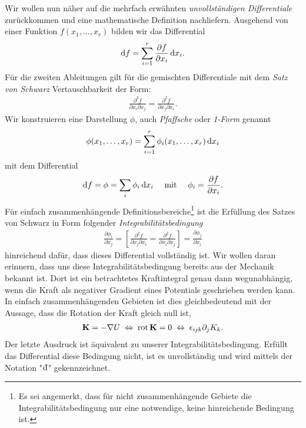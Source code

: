 Wir wollen nun näher auf die mehrfach erwähnten \emph{unvollständigen Differentiale} zurückkommen und eine mathematische Definition nachliefern. Ausgehend von einer Funktion $f(x_1,\ldots,x_r)$ bilden wir das Differential
\begin{align*}
    \mathop{}\!\mathrm{d} f = \sum_{i=1}^r \frac{\partial f}{\partial x_i} \mathop{}\!\mathrm{d} x_i.
\end{align*}
Für die zweiten Ableitungen gilt für die gemischten Differentiale mit dem \emph{Satz von Schwarz} Vertauschbarkeit der Form:
\begin{align*}
    \frac{\partial ^2 f}{\partial x_i \partial x_j} = \frac{\partial ^2 f}{\partial x_j \partial x_i}.
\end{align*}
Wir konstruieren eine Darstellung $\phi$, auch \emph{Pfaffsche} oder \emph{1-Form} genannt
\begin{align*}
    \phi (x_1,\ldots,x_r)=\sum _{i=1}^r \phi_i(x_1,\ldots,x_r)\mathop{}\!\mathrm{d} x_i
\end{align*}
mit dem Differential
\begin{align*}
    \mathop{}\!\mathrm{d} f = \phi = \sum_i \phi_i \mathop{}\!\mathrm{d} x_i \quad\text{ mit }\quad \phi_i = \frac{\partial f}{\partial x_i}.
\end{align*}
Für einfach zusammenhängende Definitionsbereiche\footnote{Es sei angemerkt, dass für nicht zusammenhängende Gebiete die Integrabilitätsbedingung nur eine notwendige, keine hinreichende Bedingung ist.} ist die Erfüllung des Satzes von Schwarz in Form folgender \emph{Integrabilitätsbedingung}
\begin{align*}
    \frac{\partial \phi_i}{\partial x_j}=\left[\frac{\partial^2f}{\partial x_j\partial x_i}=\frac{\partial^2f}{\partial x_i\partial x_j}\right]=\frac{\partial \phi_j}{\partial x_i}
\end{align*}
hinreichend dafür, dass dieses Differential vollständig ist.
Wir wollen daran erinnern, dass uns diese Integrabilitätsbedingung bereits aus der Mechanik bekannt ist. Dort ist ein betrachtetes Kraftintegral genau dann wegunabhängig, wenn die Kraft als negativer Gradient eines Potentials geschrieben werden kann. In einfach zusammenhängenden Gebieten ist dies gleichbedeutend mit der Aussage, dass die Rotation der Kraft gleich null ist,
\begin{align*}
    \mathbf{K}=-\nabla U \;\Leftrightarrow\; \operatorname{rot}\mathbf{K}=0 \;\Leftrightarrow\; \epsilon_{ijk}\partial_jK_k.
\end{align*}
Der letzte Ausdruck ist äquivalent zu unserer Integrabilitätsbedingung.
Erfüllt das Differential diese Bedingung nicht, ist es unvollständig und wird mittels der Notation "$\udiff$" gekennzeichnet.
